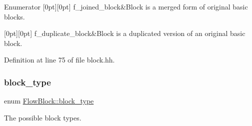 \begin{DoxyEnumFields}{Enumerator}
[0pt][0pt]{}\mbox{\label{class_flow_block_a26c4544d5e03d58799f03a43a46f78d2a2342aaea273caf2fbd3fb633bb9f1013}} 
f\+\_\+joined\+\_\+block&Block is a merged form of original basic blocks. \\
\hline

[0pt][0pt]{}\mbox{\label{class_flow_block_a26c4544d5e03d58799f03a43a46f78d2ac1eba11e8c914e6a242f81da5f897a32}} 
f\+\_\+duplicate\+\_\+block&Block is a duplicated version of an original basic block. \\
\hline

\end{DoxyEnumFields}


Definition at line 75 of file block.\+hh.

\mbox{\label{class_flow_block_a70df78390870fcdd51e31426ba6a193e}} 
\subsubsection{\texorpdfstring{block\_type}{block\_type}}
{\footnotesize\ttfamily enum \mbox{\hyperlink{class_flow_block_a70df78390870fcdd51e31426ba6a193e}{Flow\+Block\+::block\+\_\+type}}}



The possible block types. 

